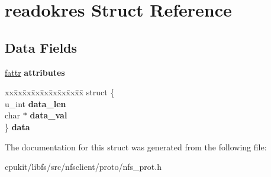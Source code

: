 \hypertarget{structreadokres}{}\section{readokres Struct Reference}
\label{structreadokres}
\subsection*{Data Fields}
\begin{DoxyCompactItemize}
\item 
\mbox{\label{structreadokres_ae5cca00bac164167958d143330623d52}} 
\mbox{\hyperlink{structfattr}{fattr}} {\bfseries attributes}
\item 
\mbox{\label{structreadokres_af0f47ba8b580f2210e7696db668411a6}} 
\begin{tabbing}
xx\=xx\=xx\=xx\=xx\=xx\=xx\=xx\=xx\=\kill
struct \{\\
\>u\_int {\bfseries data\_len}\\
\>char $\ast$ {\bfseries data\_val}\\
\} {\bfseries data}\\

\end{tabbing}\end{DoxyCompactItemize}


The documentation for this struct was generated from the following file\+:\begin{DoxyCompactItemize}
\item 
cpukit/libfs/src/nfsclient/proto/nfs\+\_\+prot.\+h\end{DoxyCompactItemize}
